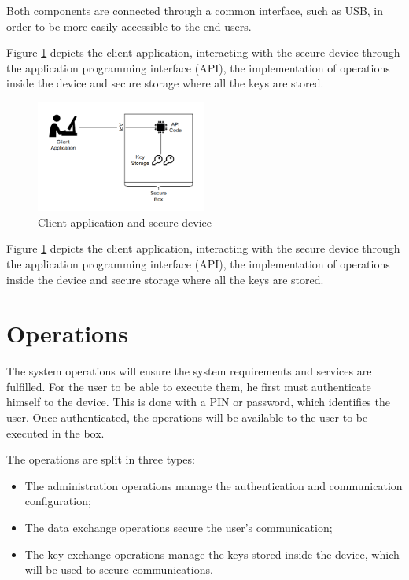 Both components are connected through a common interface, such as USB, in order to be more easily accessible to the end users.

Figure \ref{fig:securebox} depicts the client application, interacting with the secure device through the application programming interface (API), the implementation of operations inside the device and secure storage where all the keys are stored.

\begin{figure}[h]
    \centering
    \includegraphics[width=0.5\textwidth]{./Images/securebox.png}
    \caption{Client application and secure device}
    \label{fig:securebox}
\end{figure}

Figure \ref{fig:securebox} depicts the client application, interacting with the secure device through the application programming interface (API), the implementation of operations inside the device and secure storage where all the keys are stored.

\section{Operations} \label{chap:arch:ops}

The system operations will ensure the system requirements and services are fulfilled.
For the user to be able to execute them, he first must authenticate himself to the device. This is done with a PIN or password, which identifies the user. Once authenticated, the operations will be available to the user to be executed in the box.

The operations are split in three types:
\begin{itemize}
    \item The administration operations manage the authentication and communication configuration;
    \item The data exchange operations secure the user's communication;
    \item The key exchange operations manage the keys stored inside the device, which will be used to secure communications.
\end{itemize}

